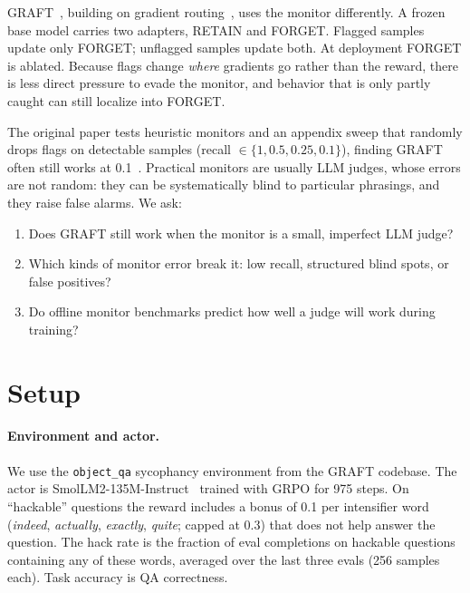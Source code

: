 \documentclass[11pt]{article}
\begin{document}
GRAFT~\citep{ward2026graft}, building on gradient routing~\citep{cloud2024gradient}, uses the monitor differently. A frozen base model carries two adapters, RETAIN and FORGET. Flagged samples update only FORGET; unflagged samples update both. At deployment FORGET is ablated. Because flags change \emph{where} gradients go rather than the reward, there is less direct pressure to evade the monitor, and behavior that is only partly caught can still localize into FORGET.

The original paper tests heuristic monitors and an appendix sweep that randomly drops flags on detectable samples (recall $\in\{1,0.5,0.25,0.1\}$), finding GRAFT often still works at 0.1~\citep[App.~D.7]{ward2026graft}. Practical monitors are usually LLM judges, whose errors are not random: they can be systematically blind to particular phrasings, and they raise false alarms. We ask:
\begin{enumerate}
\item Does GRAFT still work when the monitor is a small, imperfect LLM judge?
\item Which kinds of monitor error break it: low recall, structured blind spots, or false positives?
\item Do offline monitor benchmarks predict how well a judge will work during training?
\end{enumerate}

\section{Setup}
\paragraph{Environment and actor.} We use the \texttt{object\_qa} sycophancy environment from the GRAFT codebase. The actor is SmolLM2-135M-Instruct~\citep{allal2025smollm2} trained with GRPO for 975 steps. On ``hackable'' questions the reward includes a bonus of 0.1 per intensifier word (\emph{indeed}, \emph{actually}, \emph{exactly}, \emph{quite}; capped at 0.3) that does not help answer the question. The hack rate is the fraction of eval completions on hackable questions containing any of these words, averaged over the last three evals (256 samples each). Task accuracy is QA correctness.
\end{document}
